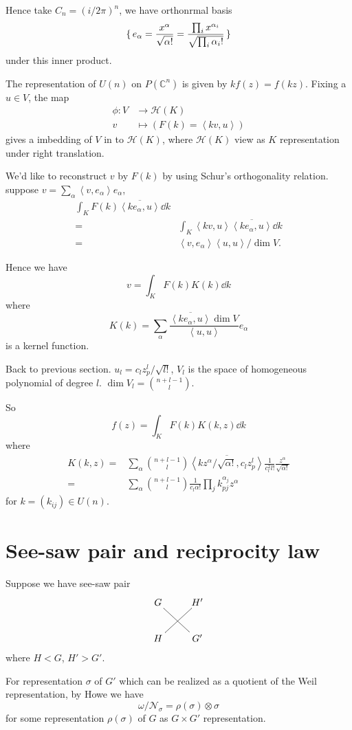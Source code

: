 \documentclass[12pt]{article}
\def\bC{{\mathbb{C}}}
\def\sH{\mathcal{H}}
\def\inn#1#2{\left\langle{#1},{#2}\right\rangle}
\def\cnn{\mathcal{N}}
\begin{document}
Hence take $C_n = (i/2\pi)^n$, we have orthonrmal basis 
\[
\set{e_\alpha = \frac{x^\alpha}{\sqrt{\alpha!}}=\frac{\prod_i x^{\alpha_i}}{\sqrt{\prod_i \alpha_i!}}}
\]
under this inner product.

The representation of $U(n)$ on $P(\bC^n)$ is given by  $k f(z)  =f(kz)$. 
Fixing a $u\in V$, the map 
\begin{align*}
\phi\colon V &\to  \sH(K)\\
v & \mapsto (F(k)=\inn{kv}{u})
\end{align*}
gives a imbedding of $V$ in to $\sH(K)$, 
where $\sH(K)$ view as $K$ representation under right translation.

We'd like to reconstruct $v$ by $F(k)$ by using Schur's orthogonality relation. 
suppose $v = \sum_{\alpha} \inn{v}{e_\alpha} e_\alpha$, 
\[
\begin{split}
\int_K F(k) \overline{\inn{ke_\alpha}{u}} \dd k \\
= &\int_K  \inn{kv}{u}\overline{\inn{ke_\alpha}{u}}\dd k\\
= &\inn{v}{e_\alpha}\inn{u}{u}/\dim V.
\end{split}
\]

Hence we have 
\[
v = \int_K F(k) K(k) \dd k
\]
where 
\[
K(k) = \sum_{\alpha} \frac{\overline{\inn{ke_\alpha}{u}}\dim V}{\inn{u}{u}} e_\alpha 
\]
is a kernel function. 

Back to previous section. $u_l = c_l z_p^l/\sqrt{l!}$, $V_l$ is the space of homogeneous polynomial of degree $l$.
$\dim V_l  = \binom{n+l-1}{l}$.
   
So 
\[
f(z) = \int_K F(k) K(k,z) \dd k 
\]
where 
\[
\begin{split}
K(k,z) =& \sum_{\alpha} \binom{n+l-1}{l} 
\overline{\inn{k z^\alpha/\sqrt{\alpha!}}{c_lz_p^l}}\frac{1}{c_l^2l!}
\frac{z^\alpha}{\sqrt{\alpha!}}\\
= & \sum_\alpha \binom{n+l-1}{l}\frac{1}{c_l \alpha!}
\prod_j k_{pj}^{\alpha_j} z^\alpha
\end{split}
\]
for $k = (k_{ij}) \in U(n)$. 

\section{See-saw pair and reciprocity law}
Suppose we have see-saw pair
\[
\xymatrix{G \ar@{-}[dr] & H'\\
H\ar@{-}[ur] & G'
}
\]
where $H < G$, $H'> G'$. 

For representation $\sigma$ of $G'$ which can be realized as a quotient of
the Weil representation, by Howe we have
\[
 \omega/\cnn_\sigma= \rho(\sigma)\otimes \sigma
\]
for some representation $\rho(\sigma)$ of $G$ as $G\times G'$ representation.
\end{document}
